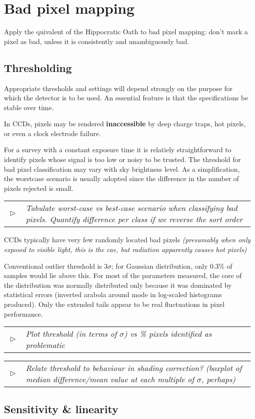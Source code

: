 \documentclass[10pt,fleqn]{article}
\renewcommand{\todo}[1]{
	\begin{minipage}{\textwidth}
	\textcolor{black}{
					\begin{tabular}{p{0.01\textwidth}p{0.95\textwidth}}
						$\vartriangleright$ & \textit{#1}
					\end{tabular}
					}
	\end{minipage}
}
\begin{document}
\section{Bad pixel mapping \cite{badpxmapping}}

Apply the quivalent of the Hippocratic Oath to bad pixel mapping: don't mark a pixel as bad, unless it is consistently and unambiguously bad.
 
\subsection{Thresholding}
Appropriate thresholds and settings will depend strongly on the purpose for which the detector is to be used. An essential feature is that the specifications be stable over time.
 
In CCDs, pixels may be rendered \textbf{inaccessible} by deep charge traps, hot pixels, or even a clock electrode failure.

For a survey with a constant exposure time it is relatiely straightforward to identify pixels whose signal is too low or noisy to be trusted. The threshold for bad pixel classification may vary with sky brightness level. As a simplification, the worstcase scenario is usually adopted since the difference in the number of pixels rejected is small.

\todo{Tabulate worst-case vs best-case scenario when classifying bad pixels. Quantify difference per class if we reverse the sort order}
 
CCDs typically have very few randomly located bad pixels \emph{(presumably when only exposed to visible light, this is the cae, but radiation apparently causes hot pixels)}

Conventional outlier threshold is $3\sigma$; for Gaussian distribution, only 0.3\% of samples would lie above this. For most of the parameters measured, the core of the distribution was normally distributed only because it was dominated by statistical errors (inverted arabola around mode in log-scaled histograms produced). Only the extended tails appear to be real fluctuations in pixel performance.

\todo{Plot threshold (in terms of $\sigma$) vs \% pixels identified as problematic}
\todo{Relate threshold to behaviour in shading correction? (boxplot of median difference/mean value at each multiple of $\sigma$, perhaps)}

\subsection{Sensitivity \& linearity}
\end{document}
